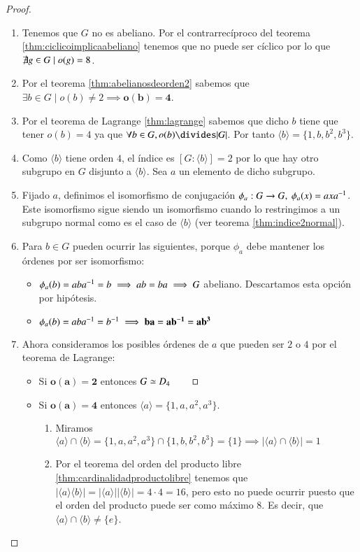 \begin{proof}$ $\newline
	\begin{enumerate}
		\item Tenemos que $G$ no es abeliano. Por el contrarrecíproco del teorema \ref{thm:ciclicoimplicaabeliano} tenemos que no puede ser cíclico por lo que $\not\exists g \in G \mid o(g) = 8$.
		\item Por el teorema \ref{thm:abelianosdeorden2} sabemos que $\exists b \in G \mid o(b) \neq 2 \implies \mathbf{o(b) = 4}$.
		\item Por el teorema de Lagrange \ref{thm:lagrange} sabemos que dicho $b$ tiene que tener $o(b) = 4$ ya que $\forall b \in G, o(b) \divides |G|$. Por tanto $\langle b \rangle = \{1, b, b^2, b^3\}$.
		\item Como $\langle b \rangle$ tiene orden $4$, el índice es $[G: \langle b \rangle] = 2$ por lo que hay otro subgrupo en $G$ disjunto a $\langle b \rangle$. Sea $a$ un elemento de dicho subgrupo.
		\item Fijado $a$, definimos el isomorfismo de conjugación $\phi_a: G \to G,\ \phi_a(x) = axa^{-1}$. Este isomorfismo sigue siendo un isomorfismo cuando lo restringimos a un subgrupo normal como es el caso de $\langle b \rangle$ (ver teorema \ref{thm:indice2normal}).
		\item Para $b \in G$ pueden ocurrir las siguientes, porque $\phi_a$ debe mantener los órdenes por ser isomorfismo:
		\begin{itemize}
			\item $\phi_a(b) = aba^{-1} = b \implies ab = ba \implies G$ abeliano. Descartamos esta opción por hipótesis.
			\item $\phi_a(b) = aba^{-1} = b^{-1} \implies \mathbf{ba = ab^{-1} = ab^3}$
		\end{itemize}
		\item Ahora consideramos los posibles órdenes de $a$ que pueden ser $2$ o $4$ por el teorema de Lagrange:
		\begin{itemize}
			\item Si $\mathbf{o(a) = 2}$ entonces $G \simeq D_4\ \qed$
			\item Si $\mathbf{o(a) = 4}$ entonces $\langle a \rangle = \{1, a, a^2, a^3\}$.
			\begin{enumerate}
				\item Miramos $\langle a \rangle \cap \langle b \rangle = \{1, a, a^2, a^3\} \cap \{1, b, b^2, b^3\} = \{1\} \implies |\langle a \rangle \cap \langle b \rangle| = 1$
				\item Por el teorema del orden del producto libre \ref{thm:cardinalidadproductolibre} tenemos que $|\langle a \rangle \langle b \rangle| = |\langle a \rangle ||\langle b \rangle| = 4 \cdot 4 = 16$, pero esto no puede ocurrir puesto que el orden del producto puede ser como máximo $8$. Es decir, que $\langle a \rangle \cap \langle b \rangle \neq \{e\}$.

\end{enumerate}
\end{itemize}
\end{enumerate}
\end{proof}
